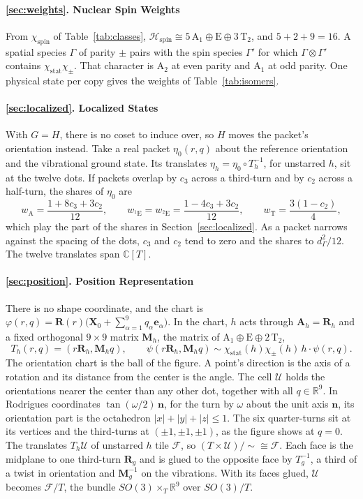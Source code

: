 \documentclass[11pt]{article}
\newcommand{\R}{\mathbb{R}}
\newcommand{\spin}{\mathcal{H}_{\mathrm{spin}}}
\newcommand{\act}{\mathbin{\cdot}}
\newcommand{\stat}{\chi_{\mathrm{stat}}}
\newcommand{\X}{\mathbf{X}}
\newcommand{\Rmat}{\mathbf{R}}
\begin{document}
\paragraph{\ref{sec:weights}. Nuclear Spin Weights}
From $\chi_{\mathrm{spin}}$ of Table~\ref{tab:classes},
$\spin\cong5\,\mathrm A_1\oplus\mathrm E\oplus3\,\mathrm T_2$, and $5+2+9=16$. A spatial species
$\Gamma$ of parity $\pm$ pairs with the spin species $\Gamma'$ for which $\Gamma\otimes\Gamma'$ contains
$\stat\chi_\pm$. That character is $\mathrm A_2$ at even parity and $\mathrm A_1$ at odd parity. One
physical state per copy gives the weights of Table~\ref{tab:isomers}.

\paragraph{\ref{sec:localized}. Localized States}
With $G=H$, there is no coset to induce over, so $H$ moves the
packet's orientation instead. Take a real packet $\eta_0(r,q)$ about the reference orientation and the
vibrational ground state. Its translates $\eta_h=\eta_0\circ T_h^{-1}$, for unstarred $h$, sit at the
twelve dots. If packets overlap by $c_3$ across a third-turn and by $c_2$ across a half-turn, the shares
of $\eta_0$ are
\[
w_{\mathrm A}=\frac{1+8c_3+3c_2}{12},\qquad
w_{{}^1\mathrm E}=w_{{}^2\mathrm E}=\frac{1-4c_3+3c_2}{12},\qquad
w_{\mathrm T}=\frac{3(1-c_2)}{4},
\]
which play the part of the shares in Section~\ref{sec:localized}. As a packet narrows against the spacing
of the
dots, $c_3$ and $c_2$ tend to zero and the shares to $d_\Gamma^2/12$. The twelve translates span $\mathbb
C[T]$.

\paragraph{\ref{sec:position}. Position Representation}
There is no shape coordinate, and the chart is
$\varphi(r,q)=\Rmat(r)\bigl(\X_0+\sum_{\alpha=1}^{9}q_\alpha\mathbf e_\alpha\bigr)$. In the chart, $h$ acts
through $\mathbf A_h=\Rmat_h$ and a fixed orthogonal $9\times9$ matrix $\mathbf M_h$, the matrix of
$\mathrm A_1\oplus\mathrm E\oplus2\,\mathrm T_2$,
\[
T_h(r,q)=(r\Rmat_h,\mathbf M_hq),\qquad
\psi(r\Rmat_h,\mathbf M_hq)\sim\stat(h)\chi_\pm(h)\,h\act\psi(r,q).
\]
The orientation chart is the ball of the figure. A point's direction is the axis of a rotation and its
distance from the center is the angle. The cell $\mathcal U$ holds the orientations nearer the center
than any other dot, together with all $q\in\R^9$. In Rodrigues coordinates $\tan(\omega/2)\,\mathbf n$,
for the turn by $\omega$ about the unit axis $\mathbf n$, its orientation part is the octahedron
$|x|+|y|+|z|\le1$. The six quarter-turns sit at its vertices and the third-turns at
$(\pm1,\pm1,\pm1)$, as the figure shows at $q=0$. The translates $T_h\mathcal U$ of unstarred $h$ tile
$\mathcal F$, so $(T\times\mathcal U)/{\sim}\cong\mathcal F$. Each face is the midplane to one third-turn
$\Rmat_g$ and is glued to the opposite face by $T_g^{-1}$, a third of a twist in orientation and
$\mathbf M_g^{-1}$ on the vibrations. With its faces glued, $\mathcal U$ becomes $\mathcal F/T$, the
bundle $SO(3)\times_T\R^9$ over $SO(3)/T$.
\end{document}
